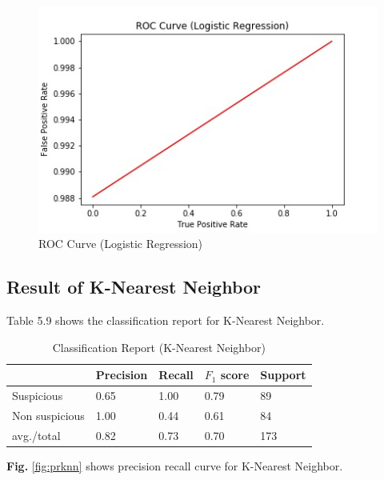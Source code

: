 \documentclass[12pt,a4paper]{report}
\begin{document}
\begin{figure}[h!]
    \centering
    \includegraphics[scale=0.58]{Figures/ROCL.jpg}
    \caption{ROC Curve (Logistic Regression)}
    \label{fig:rocl}
\end{figure}


\subsection{Result of K-Nearest Neighbor}
Table 5.9 shows the classification report for K-Nearest Neighbor.

\begin{table}[h!]
\begin{center}
\caption{Classification Report (K-Nearest Neighbor)}
\begin{tabular}{|m{4.4cm} | m{2cm}| m{2cm}| m{2cm}| m{2cm}|}
\hline
     & Precision & Recall & $F_1$ score & Support \\
\hline
     Suspicious & 0.65 & 1.00 & 0.79 & 89\\
\hline 
     Non suspicious  & 1.00 & 0.44 & 0.61 & 84\\
\hline 
     avg./total & 0.82 & 0.73 & 0.70 & 173\\
\hline
\end{tabular}
\end{center}
\end{table}

\noindent
\textbf{Fig.} \ref{fig:prknn} shows precision recall curve for K-Nearest Neighbor.
\end{document}
